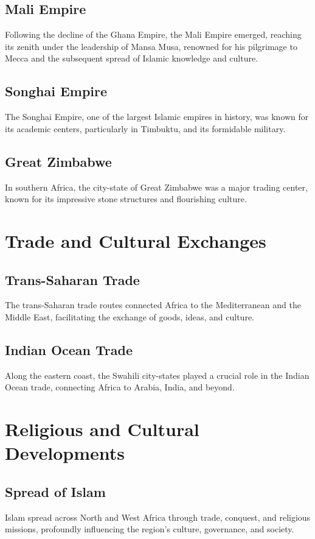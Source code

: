 \documentclass[a4paper,12pt]{book}
\begin{document}
\subsection{Mali Empire}
Following the decline of the Ghana Empire, the Mali Empire emerged, reaching its zenith under the leadership of Mansa Musa, renowned for his pilgrimage to Mecca and the subsequent spread of Islamic knowledge and culture.

\subsection{Songhai Empire}
The Songhai Empire, one of the largest Islamic empires in history, was known for its academic centers, particularly in Timbuktu, and its formidable military.

\subsection{Great Zimbabwe}
In southern Africa, the city-state of Great Zimbabwe was a major trading center, known for its impressive stone structures and flourishing culture.

\section{Trade and Cultural Exchanges}
\label{sec:trade-cultural-exchanges}

\subsection{Trans-Saharan Trade}
The trans-Saharan trade routes connected Africa to the Mediterranean and the Middle East, facilitating the exchange of goods, ideas, and culture.

\subsection{Indian Ocean Trade}
Along the eastern coast, the Swahili city-states played a crucial role in the Indian Ocean trade, connecting Africa to Arabia, India, and beyond.

\section{Religious and Cultural Developments}
\label{sec:religious-cultural-developments}

\subsection{Spread of Islam}
Islam spread across North and West Africa through trade, conquest, and religious missions, profoundly influencing the region’s culture, governance, and society.
\end{document}
